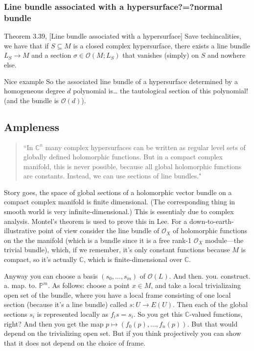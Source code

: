 \subsubsection*{Line bundle associated with a hypersurface?=?normal bundle}

\begin{thing4}{Theorem 3.39, \cite{lec}}[Line bundle associated with a hypersurface]\label{thm:3.39, lec}\leavevmode
Save techincalities, we have that if \(S \subseteq M\) is a closed complex hypersurface, there exists a line bundle \(L_S \to M\) and a section \(\sigma \in \mathcal{O}(M;L_S)\) that vanishes (simply) on \(S\) and nowhere else.
\end{thing4}

\begin{thing8}{Nice example}\leavevmode
So the associated line bundle of a hypersurface determined by a homogeneous degree \(d\) polynomial is… the tautological section of this polynomial! (and the bundle is \(\mathcal{O}(d)\)).
\end{thing8}

\subsection{Ampleness}
\begin{quotation}
	``In \(\mathbb{C}^n\) many complex hypersurfaces can be written as regular level sets of globally defined holomorphic functions. But in a compact complex manifold, this is never possible, because all global holomorphic functions are constants. Instead, we can use sections of line bundles."
\end{quotation}

Story goes, the space of global sections of a holomorphic vector bundle on a compact complex manifold is finite dimensional. (The corresponding thing in smooth world is very infinite-dimensional.) This is essentialy due to complex analysis. Montel's theorem is used to prove this in Lee. For a down-to-earth-illustrative point of view consider the line bundle of \(\mathcal{O}_X\) of holomorphic functions on the the manifold (which is a bundle since it is a free rank-1 \(\mathcal{O}_X\) module---the trivial bundle), which, if we remember, it's only constant functions because \(M\) is compact, so it's actually \(\mathbb{C}\), which is finite-dimensional over \(\mathbb{C}\).

Anyway you can choose a basis \((s_0,\ldots,s_m)\) of \(\mathcal{O}(L)\). And then. you. construct. a. map. to. \(\mathbb{P}^m\). As follows: choose a point \(x \in M\), and take a local trivializaing open set of the bundle, where you have a local frame consisting of one local section (because it's a line bundle) called \(s: U \to E(U)\). Then each of the global sections \(s_i\) is represented locally as \(f_is=s_i\). So you get this \(\mathbb{C}\)-valued functions, right? And then you get the map \(p \mapsto (f_0(p),\ldots,f_n(p))\). But that would depend on the trivializing open set. But if you think projectively you can show that it does not depend on the choice of frame.

